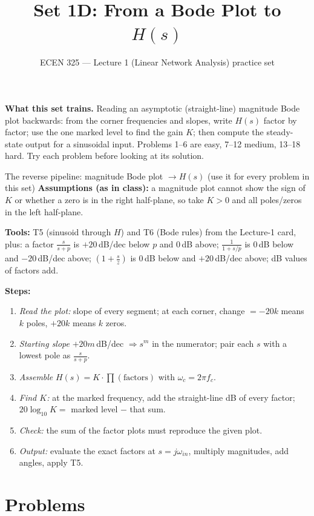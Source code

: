 \documentclass[11pt]{article}
\title{Set 1D: From a Bode Plot to $H(s)$}
\author{ECEN 325 --- Lecture 1 (Linear Network Analysis) practice set}
\date{}
\begin{document}
\maketitle

\textbf{What this set trains.} Reading an asymptotic (straight-line) magnitude Bode plot backwards: from the
corner frequencies and slopes, write $H(s)$ factor by factor; use the one marked level to find the gain $K$;
then compute the steady-state output for a sinusoidal input. Problems 1--6 are easy, 7--12 medium, 13--18 hard.
Try each problem before looking at its solution.


\begin{cardbox}{The reverse pipeline: magnitude Bode plot $\to H(s)$ (use it for every problem in this set)}
\textbf{Assumptions (as in class):} a magnitude plot cannot show the sign of $K$ or whether a zero is in the
right half-plane, so take $K>0$ and all poles/zeros in the left half-plane.

\textbf{Tools:} T5 (sinusoid through $H$) and T6 (Bode rules) from the Lecture-1 card, plus:
a factor $\frac{s}{s+p}$ is $+20$\,dB/dec below $p$ and $0$\,dB above; $\frac{1}{1+s/p}$ is $0$\,dB below and
$-20$\,dB/dec above; $\left(1+\frac{s}{z}\right)$ is $0$\,dB below and $+20$\,dB/dec above; dB values of factors add.

\textbf{Steps:}
\begin{enumerate}[leftmargin=2.2em,itemsep=1pt]
\item \emph{Read the plot:} slope of every segment; at each corner, change $=-20k$ means $k$ poles, $+20k$ means $k$ zeros.
\item \emph{Starting slope} $+20m$\,dB/dec $\Rightarrow s^m$ in the numerator; pair each $s$ with a lowest pole as $\frac{s}{s+p}$.
\item \emph{Assemble} $H(s)=K\cdot\prod(\text{factors})$ with $\omega_c=2\pi f_c$.
\item \emph{Find $K$:} at the marked frequency, add the straight-line dB of every factor; $20\log_{10}K =$ marked level $-$ that sum.
\item \emph{Check:} the sum of the factor plots must reproduce the given plot.
\item \emph{Output:} evaluate the exact factors at $s=j\omega_{in}$, multiply magnitudes, add angles, apply T5.
\end{enumerate}
\end{cardbox}

\section*{Problems}
\end{document}
